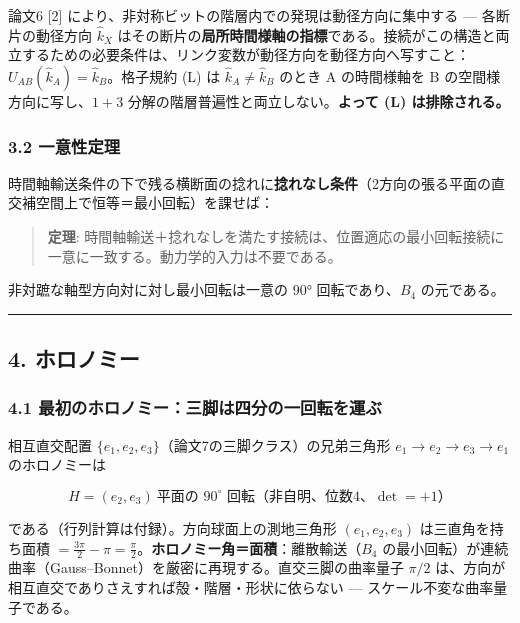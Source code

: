 \documentclass[
]{ltjsarticle}
\begin{document}
論文6 {[}2{]} により、非対称ビットの階層内での発現は動径方向に集中する
--- 各断片の動径方向 \(\hat k_X\)
はその断片の\textbf{局所時間様軸の指標}である。接続がこの構造と両立するための必要条件は、リンク変数が動径方向を動径方向へ写すこと：\(U_{AB}(\hat k_A)=\hat k_B\)。格子規約
(L) は \(\hat k_A\ne\hat k_B\) のとき A の時間様軸を B
の空間様方向に写し、\(1{+}3\)
分解の階層普遍性と両立しない。\textbf{よって (L) は排除される。}

\subsubsection{3.2 一意性定理}\label{ux4e00ux610fux6027ux5b9aux7406}

時間軸輸送条件の下で残る横断面の捻れに\textbf{捻れなし条件}（2方向の張る平面の直交補空間上で恒等＝最小回転）を課せば：

\begin{quote}
\textbf{定理}:
時間軸輸送＋捻れなしを満たす接続は、位置適応の最小回転接続に一意に一致する。動力学的入力は不要である。
\end{quote}

非対蹠な軸型方向対に対し最小回転は一意の 90° 回転であり、\(B_4\)
の元である。

\begin{center}\rule{0.5\linewidth}{0.5pt}\end{center}

\subsection{4. ホロノミー}\label{ux30dbux30edux30ceux30dfux30fc}

\subsubsection{4.1
最初のホロノミー：三脚は四分の一回転を運ぶ}\label{ux6700ux521dux306eux30dbux30edux30ceux30dfux30fcux4e09ux811aux306fux56dbux5206ux306eux4e00ux56deux8ee2ux3092ux904bux3076}

相互直交配置 \(\{e_1,e_2,e_3\}\)（論文7の三脚クラス）の兄弟三角形
\(e_1\to e_2\to e_3\to e_1\) のホロノミーは

\[
H=(e_2,e_3)\ \text{平面の }90^\circ\text{ 回転（非自明、位数4、}\det=+1\text{）}
\]

である（行列計算は付録）。方向球面上の測地三角形 \((e_1,e_2,e_3)\)
は三直角を持ち面積
\(=\tfrac{3\pi}2-\pi=\tfrac\pi2\)。\textbf{ホロノミー角＝面積}：離散輸送（\(B_4\)
の最小回転）が連続曲率（Gauss--Bonnet）を厳密に再現する。直交三脚の曲率量子
\(\pi/2\) は、方向が相互直交でありさえすれば殻・階層・形状に依らない ---
スケール不変な曲率量子である。
\end{document}
